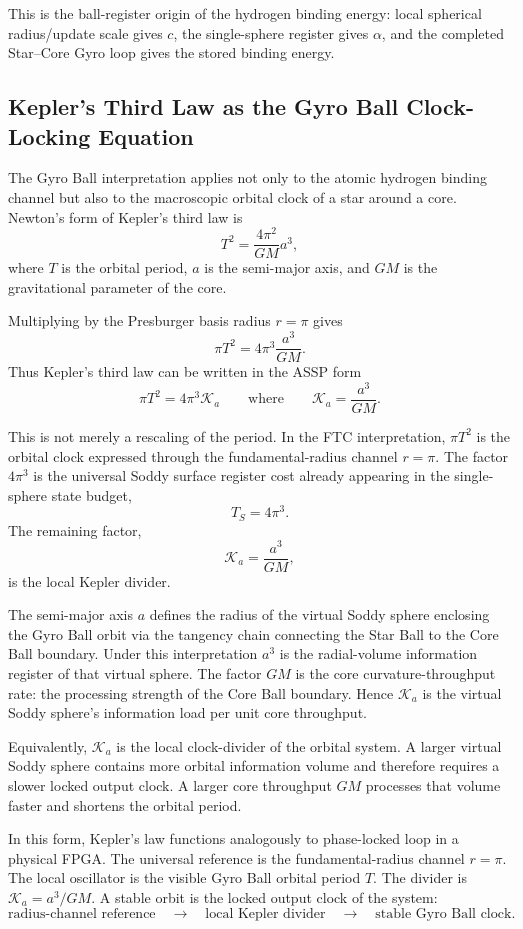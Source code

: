 \documentclass[11pt,a4paper]{article}
\begin{document}
This is the ball-register origin of the hydrogen binding energy: local spherical radius/update scale gives \(c\), the single-sphere register gives \(\alpha\), and the completed Star--Core Gyro loop gives the stored binding energy.

\subsection{Kepler's Third Law as the Gyro Ball Clock-Locking Equation}
\label{sec:kepler_clock}

The Gyro Ball interpretation applies not only to the atomic hydrogen binding channel but also to the macroscopic orbital clock of a star around a core. Newton's form of Kepler's third law is~\cite{Newton1687}
\[
T^2=\frac{4\pi^2}{GM}a^3,
\]
where \(T\) is the orbital period, \(a\) is the semi-major axis, and \(GM\) is the gravitational parameter of the core.

Multiplying by the Presburger basis radius \(r=\pi\) gives
\[
\pi T^2
=
4\pi^3\frac{a^3}{GM}.
\]
Thus Kepler's third law can be written in the ASSP form
\[
\boxed{
\pi T^2
=
4\pi^3\mathcal{K}_a
}
\qquad
\text{where}
\qquad
\mathcal{K}_a=\frac{a^3}{GM}.
\]

This is not merely a rescaling of the period. In the FTC interpretation, \(\pi T^2\) is the orbital clock expressed through the fundamental-radius channel \(r=\pi\). The factor \(4\pi^3\) is the universal Soddy surface register cost already appearing in the single-sphere state budget,
\[
T_S=4\pi^3.
\]
The remaining factor,
\[
\mathcal{K}_a=\frac{a^3}{GM},
\]
is the local Kepler divider.

The semi-major axis \(a\) defines the radius of the virtual Soddy sphere enclosing the Gyro Ball orbit via the tangency chain connecting the Star Ball to the Core Ball boundary. Under this interpretation \(a^3\) is the radial-volume information register of that virtual sphere. The factor \(GM\) is the core curvature-throughput rate: the processing strength of the Core Ball boundary. Hence \(\mathcal{K}_a\) is the virtual Soddy sphere's information load per unit core throughput.

Equivalently, \(\mathcal{K}_a\) is the local clock-divider of the orbital system. A larger virtual Soddy sphere contains more orbital information volume and therefore requires a slower locked output clock. A larger core throughput \(GM\) processes that volume faster and shortens the orbital period.

In this form, Kepler's law functions analogously to phase-locked loop in a physical FPGA. The universal reference is the fundamental-radius channel \(r=\pi\). The local oscillator is the visible Gyro Ball orbital period \(T\). The divider is \(\mathcal{K}_a=a^3/GM\). A stable orbit is the locked output clock of the system:
\[
\text{radius-channel reference}
\quad\longrightarrow\quad
\text{local Kepler divider}
\quad\longrightarrow\quad
\text{stable Gyro Ball clock}.
\]
\end{document}
